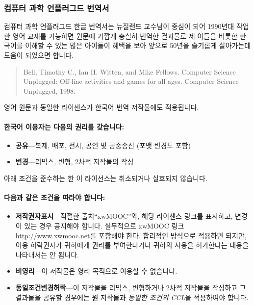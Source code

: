 \documentclass[]{article}
\begin{document}

\subsubsection{컴퓨터 과학 언플러그드 번역서}\label{section-280}

컴퓨터 과학 언플러그드 한글 번역서는 뉴질랜드 교수님이 중심이 되어
1990년대 작업한 영어 교재를 가능하면 원문에 가깝게 충실히 번역한
결과물로 제 아들을 비롯한 한국어를 이해할 수 있는 많은 아이들이 혜택을
보아 앞으로 50년을 슬기롭게 살아가는데 도움이 되었으면 합니다.

\begin{quote}
Bell, Timothy C., Ian H. Witten, and Mike Fellows. Computer Science
Unplugged: Off-line activities and games for all ages. Computer Science
Unplugged, 1998.
\end{quote}

영어 원문과 동일한 라이센스가 한국어 번역 저작물에도 적용됩니다.

\mbox{}\paragraph{한국어 이용자는 다음의 권리를 갖습니다:}\label{section-281}

\begin{itemize}
\itemsep1pt\parskip0pt
\item
  \textbf{공유}---복제, 배포, 전시, 공연 및 공중송신 (포맷 변경도 포함)
\item
  \textbf{변경}---리믹스, 변형, 2차적 저작물의 작성
\end{itemize}

아래 조건을 준수하는 한 이 라이선스는 취소되거나 실효되지 않습니다.

\mbox{}\paragraph{다음과 같은 조건을 따라야 합니다:}\label{section-282}

\begin{itemize}
\item
  \textbf{저작권자표시}---적절한 출처``xwMOOC''와, 해당 라이센스 링크를
  표시하고, 변경이 있는 경우 공지해야 합니다. 실무적으로 xwMOOC 링크
  http://www.xwmooc.net를 포함해야 한다. 합리적인 방식으로 적용하면
  되지만, 이용 허락권자가 귀하에게 권리를 부여한다거나 귀하의 사용을
  허가한다는 내용을 나타내서는 안 됩니다.
\item
  \textbf{비영리}---이 저작물은 영리 목적으로 이용할 수 없습니다.
\item
  \textbf{동일조건변경허락}---이 저작물을 리믹스, 변형하거나 2차적
  저작물을 작성하고 그 결과물을 공유할 경우에는 원 저작물과 \emph{동일한
  조건의 CCL}을 적용하여야 합니다.
\end{itemize}
\end{document}
